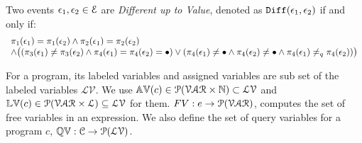 %
\begin{defn}
  Two events $\mathtt{\epsilon}_1, \mathtt{\epsilon}_2 \in \mathcal{E}$ are  \emph{Different up to Value}, 
  denoted as $\mathtt{Diff}(\mathtt{\epsilon}_1, \mathtt{\epsilon}_2)$ if and only if:
  \[
    \begin{array}{l}
  \pi_1(\mathtt{\epsilon}_1) = \pi_1(\mathtt{\epsilon}_2) 
  \land  
  \pi_2(\mathtt{\epsilon}_1) = \pi_2(\mathtt{\epsilon}_2) \\
  \land  
  \big(
    (\pi_3(\mathtt{\epsilon}_1) \neq \pi_3(\mathtt{\epsilon}_2)
  \land 
  \pi_{4}(\mathtt{\epsilon}_1) = \pi_{4}(\mathtt{\epsilon}_2) = \bullet )
  \lor 
  (\pi_4(\mathtt{\epsilon}_1) \neq \bullet
  \land 
  \pi_4(\mathtt{\epsilon}_2) \neq \bullet
  \land 
  \pi_{4}(\mathtt{\epsilon}_1) \neq_q \pi_{4}(\mathtt{\epsilon}_2)) 
  \big)
  \end{array}
  \]
  \end{defn}
For a program, its labeled variables and assigned variables are sub set of 
the labeled variables $\mathcal{LV}$.
We use  
$\mathbb{AV}(c) \in \mathcal{P}(\mathcal{VAR} \times \mathbb{N}) \subset \mathcal{LV}$ and 
$\mathbb{LV}(c) \in \mathcal{P}(\mathcal{VAR} \times \mathcal{L}) \subseteq \mathcal{LV}$ for them. $FV: e \to \mathcal{P}(\mathcal{VAR})$, computes the set of free variables in an expression. We also define the set of query variables for a program $c$, $\mathbb{QV}: \mathcal{C} \to 
\mathcal{P}(\mathcal{LV})$.
